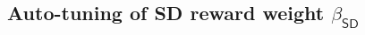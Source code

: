 \documentclass{article}
\theoremstyle{plain}
\theoremstyle{definition}
\theoremstyle{remark}
\renewcommand{\hat}{\widehat}
\newcommand{\hvec}[1]{\ensuremath{\Hat{\boldsymbol{#1}}}}
\renewcommand{\vec}[1]{\ensuremath{\boldsymbol{#1}}}
\newcommand{\mc}[1]{\ensuremath{\mathcal{#1}}}
\newcommand{\tran}{^{\top}}
\renewcommand{\eqref}[1]{(\ref{eq:#1})}
\newcommand{\Figref}[1]{Figure~\ref{fig:#1}}
\newcommand{\figref}[1]{Fig.~\ref{fig:#1}}
\newcommand{\propref}[1]{Proposition~\ref{prop:#1}}
\newcommand{\LtwoP}{\mc{L}_{2,P}}
\newcommand{\LtwovarP}{\mc{L}_{2,\mathsf{var},P}}
\newcommand{\LonestdP}{\mc{L}_{1,\mathsf{SD},P}}
\newcommand{\betavar}{\beta_{\mathsf{var}}}
\newcommand{\betastd}{\beta_{\mathsf{SD}}}
\newcommand{\betastdG}{\beta_{\mathsf{SD}}^\mc{N}}
\begin{document}


\subsection{Auto-tuning of SD reward weight \texorpdfstring{$\betastd$}{betastd}} \label{sec:betastd}
\end{document}
